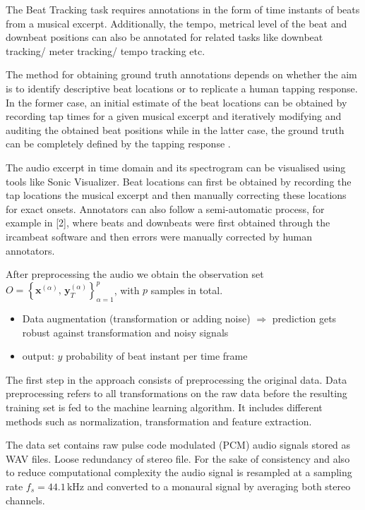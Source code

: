 \documentclass{scrartcl}
\begin{document}

The Beat Tracking task requires annotations in the form of time instants of beats from a musical excerpt. Additionally, the tempo, metrical level of the beat and downbeat positions can also be annotated for related tasks like downbeat tracking/ meter tracking/ tempo tracking etc.

The method for obtaining ground truth annotations depends on whether the aim is to identify descriptive beat locations or to replicate a human tapping response. In the former case, an initial estimate of the beat locations can be obtained by recording tap times for a given musical excerpt and iteratively modifying and auditing the obtained beat positions while in the latter case, the ground truth can be completely defined by the tapping response \cite{Davies2009b}.

The audio excerpt in time domain and its spectrogram can be visualised using tools like Sonic Visualizer. Beat locations can first be obtained by recording the tap locations the musical excerpt and then manually correcting these locations for exact onsets.  Annotators can also follow a semi-automatic process, for example in [2], where beats and downbeats were first obtained through the ircambeat software and then errors were manually corrected by human annotators.

After preprocessing the audio we obtain the observation set $ O = \left\{ \mathbf x^{(\alpha)}, \,\mathbf y_T^{(\alpha)} \right \}_{\alpha = 1}^p$, with $p$ samples in total. 

\begin{itemize}
\item Data augmentation (transformation or adding noise) $\Rightarrow$ prediction gets robust against transformation and noisy signals
\item output: $y$ probability of beat instant per time frame 
\end{itemize}



The first step in the approach consists of preprocessing the original data. Data preprocessing refers to all transformations on the raw data before the resulting training set is fed to the machine learning algorithm. It includes different methods such as normalization, transformation and feature extraction. 

The data set contains raw pulse code modulated (PCM) audio signals stored as WAV files. Loose redundancy of stereo file. For the sake of consistency and also to reduce computational complexity the audio signal is resampled at a sampling rate $f_s = 44.1 \,\text{kHz}$ and converted to a monaural signal by averaging both stereo channels. 
\end{document}
